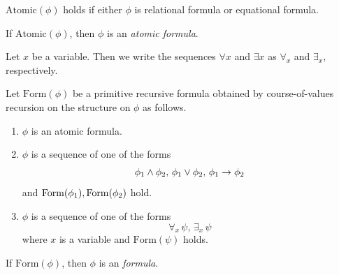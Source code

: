 \documentclass[10pt]{amsart}
\begin{document}
\begin{definition}
  $\mathrm{Atomic}(\phi)$ holds if either $\phi$ is relational formula or equational formula. 

  If $\mathrm{Atomic}(\phi)$, then $\phi$ is an \textit{atomic formula}.
\end{definition}

\begin{remark}\label{remark:quantifier_notation}
  Let $x$ be a variable. Then we write the sequences $\forall x$ and $\exists x$ as $\forall_x$ and $\exists_x$, respectively.
\end{remark}

\begin{definition}
	Let $\mathrm{Form}(\phi)$ be a primitive recursive formula obtained by course-of-values recursion on the structure on $\phi$ as follows.
  \begin{enumerate}[label=\textbf{(\arabic*)}, leftmargin=3.0em]
    \item $\phi$ is an atomic formula.
    \item $\phi$ is a sequence of one of the forms
      $$\phi_{\rm{1}}\wedge \phi_{\rm{2}},\,\phi_{\rm{1}}\vee \phi_{\rm{2}},\,\phi_{\rm{1}}\rightarrow \phi_{\rm{2}}$$
      and $\mathrm{Form}(\phi_{\rm{1}}),\mathrm{Form}(\phi_{\rm{2}})$ hold.
    \item $\phi$ is a sequence of one of the forms
      $$\forall_x\,\psi,\,\exists_x\,\psi$$
      where $x$ is a variable and $\mathrm{Form}(\psi)$ holds.
  \end{enumerate}
	If $\mathrm{Form}(\phi)$, then $\phi$ is an \textit{formula}.
\end{definition}
\end{document}
